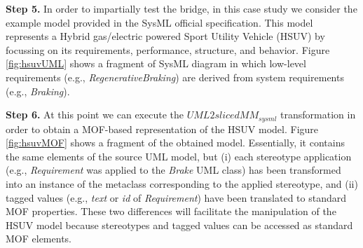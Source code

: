 \textbf{Step 5.} In order to impartially test the bridge, in this case study we consider the example model provided in the SysML official specification.
This model represents a Hybrid gas/electric powered Sport Utility Vehicle (HSUV) by focussing on its requirements, performance, structure, and behavior. 
Figure \ref{fig:hsuvUML} shows a fragment of SysML diagram in which low-level requirements
(e.g., \textit{RegenerativeBraking})
are derived from system requirements (e.g., \textit{Braking}). 

\textbf{Step 6.} At this point we can execute the $UML2slicedMM_{sysml}$ transformation in order to obtain a MOF-based representation
of the HSUV model. Figure \ref{fig:hsuvMOF} shows a fragment of the obtained model. 
Essentially, it contains the same elements of the source UML model, but (i) each stereotype application (e.g., \textit{Requirement}
was applied to the \textit{Brake} UML class)
has been transformed into an instance of the metaclass corresponding to the applied stereotype,
and (ii) tagged values (e.g., \textit{text} or \textit{id} of \textit{Requirement}) 
have been translated to standard MOF properties. These two differences will facilitate
the manipulation of the HSUV model because stereotypes and tagged values can be accessed as standard MOF elements.
%
\vspace{-.4cm}
